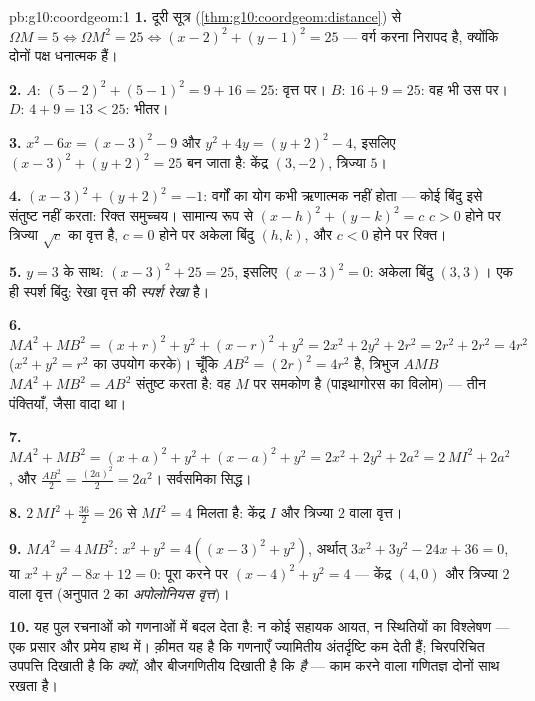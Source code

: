 \begin{solution}{pb:g10:coordgeom:1}
\textbf{1.} दूरी सूत्र (\cref{thm:g10:coordgeom:distance}) से $\Omega M = 5 \iff \Omega M^2 = 25 \iff
(x - 2)^2 + (y - 1)^2 = 25$ --- वर्ग करना निरापद है, क्योंकि दोनों
पक्ष धनात्मक हैं।

\textbf{2.} $A$: $(5-2)^2 + (5-1)^2 = 9 + 16 = 25$: वृत्त पर। $B$: $16 + 9 = 25$: वह भी उस पर। $D$: $4 + 9 = 13 < 25$:
भीतर।

\textbf{3.} $x^2 - 6x = (x - 3)^2 - 9$ और $y^2 + 4y = (y + 2)^2 - 4$, इसलिए  $(x - 3)^2 + (y + 2)^2 = 25$ बन जाता है: केंद्र $(3, -2)$,
त्रिज्या $5$।

\textbf{4.} $(x - 3)^2 + (y + 2)^2 = -1$: वर्गों का योग कभी ऋणात्मक नहीं होता --- कोई बिंदु इसे
संतुष्ट नहीं करता: रिक्त समुच्चय। सामान्य रूप से $(x - h)^2 + (y - k)^2 = c$ $c > 0$ होने पर त्रिज्या
$\sqrt c$ का वृत्त है, $c = 0$ होने पर अकेला बिंदु $(h, k)$, और $c < 0$ होने पर रिक्त।

\textbf{5.} $y = 3$ के साथ: $(x - 3)^2 + 25 = 25$, इसलिए $(x - 3)^2 = 0$: अकेला बिंदु $(3, 3)$। एक ही स्पर्श
बिंदु: रेखा वृत्त की \emph{स्पर्श रेखा} है।

\textbf{6.} $MA^2 + MB^2 = (x + r)^2 + y^2 + (x - r)^2 + y^2
= 2x^2 + 2y^2 + 2r^2 = 2r^2 + 2r^2 = 4r^2$ ($x^2 + y^2 = r^2$ का उपयोग करके)। चूँकि $AB^2 = (2r)^2 = 4r^2$ है, त्रिभुज $AMB$
$MA^2 + MB^2 = AB^2$ संतुष्ट करता है: वह $M$ पर समकोण है (पाइथागोरस का विलोम) --- तीन
पंक्तियाँ, जैसा वादा था।

\textbf{7.} $MA^2 + MB^2 = (x + a)^2 + y^2 + (x - a)^2 + y^2
= 2x^2 + 2y^2 + 2a^2 = 2\,MI^2 + 2a^2$, और $\frac{AB^2}{2} = \frac{(2a)^2}{2} = 2a^2$। सर्वसमिका सिद्ध।

\textbf{8.} $2\,MI^2 + \frac{36}{2} = 26$ से $MI^2 = 4$ मिलता है: केंद्र  $I$ और त्रिज्या
$2$ वाला वृत्त।

\textbf{9.} $MA^2 = 4\,MB^2$: $x^2 + y^2 = 4\left((x - 3)^2 + y^2\right)$, अर्थात् $3x^2 + 3y^2 - 24x + 36 = 0$, या $x^2 + y^2 - 8x + 12 = 0$: पूरा करने पर $(x - 4)^2 + y^2 = 4$ ---
केंद्र $(4, 0)$ और त्रिज्या $2$ वाला वृत्त (अनुपात $2$ का \emph{अपोलोनियस
वृत्त})।

\textbf{10.} यह पुल रचनाओं को गणनाओं में बदल देता है: न कोई सहायक आयत, न
स्थितियों का विश्लेषण --- एक प्रसार और प्रमेय हाथ में। क़ीमत यह है कि
गणनाएँ ज्यामितीय अंतर्दृष्टि कम देती हैं; चिरपरिचित उपपत्ति दिखाती है कि
\emph{क्यों}, और बीजगणितीय दिखाती है कि \emph{है} --- काम करने वाला गणितज्ञ
दोनों साथ रखता है।


\end{solution}
